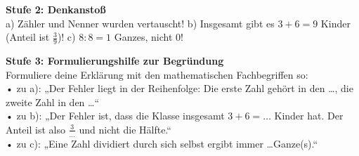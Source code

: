 \documentclass[a4paper,10pt]{article}
\begin{document}
\begin{tcolorbox}[colback=step2Bg, colframe=step2Border, arc=1.8mm, boxrule=0.7pt, left=3mm, right=3mm, top=1.8mm, bottom=1.8mm]
    {\color{step2Text}\small\bfseries\faLightbulb\enskip Stufe 2: Denkanstoß}\\[1mm]
    {\footnotesize a) Zähler und Nenner wurden vertauscht! b) Insgesamt gibt es $3 + 6 = 9$ Kinder (Anteil ist $\frac{3}{9}$)! c) $8:8 = 1$ Ganzes, nicht $0$!}
\end{tcolorbox}

\begin{tcolorbox}[colback=step3Bg, colframe=step3Border, arc=1.8mm, boxrule=0.7pt, left=3mm, right=3mm, top=1.8mm, bottom=1.8mm]
    {\color{step3Text}\small\bfseries\faPenNib\enskip Stufe 3: Formulierungshilfe zur Begründung}\\[1mm]
    {\footnotesize
    Formuliere deine Erklärung mit den mathematischen Fachbegriffen so:\\
    • zu a): „Der Fehler liegt in der Reihenfolge: Die erste Zahl gehört in den \dots, die zweite Zahl in den \dots“\\
    • zu b): „Der Fehler ist, dass die Klasse insgesamt $3 + 6 = \dots$ Kinder hat. Der Anteil ist also $\frac{3}{\dots}$ und nicht die Hälfte.“\\
    • zu c): „Eine Zahl dividiert durch sich selbst ergibt immer \dots Ganze(s).“}
\end{tcolorbox}
\end{document}
